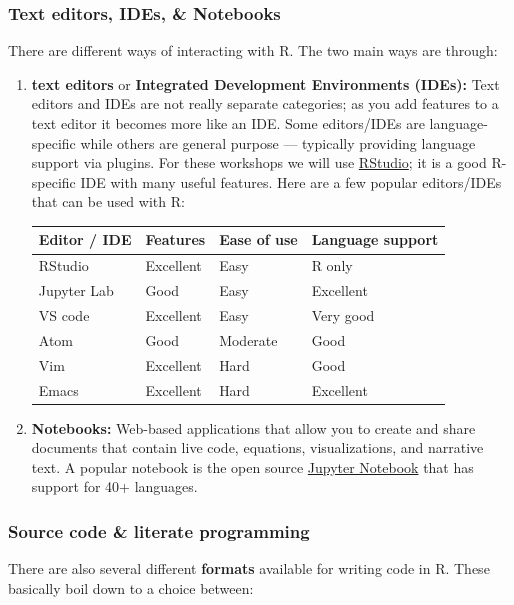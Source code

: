 \documentclass[
]{book}
\begin{document}
\hypertarget{text-editors-ides-notebooks}{%
\subsubsection{Text editors, IDEs, \& Notebooks}\label{text-editors-ides-notebooks}}

There are different ways of interacting with R. The two main ways are through:

\begin{enumerate}
\def\labelenumi{\arabic{enumi}.}
\item
  \textbf{text editors} or \textbf{Integrated Development Environments (IDEs):} Text editors and IDEs are not really separate categories; as you add features to a text editor it becomes more like an IDE. Some editors/IDEs are language-specific while others are general purpose --- typically providing language support via plugins. For these workshops we will use \href{https://rstudio.com/}{RStudio}; it is a good R-specific IDE with many useful features. Here are a few popular editors/IDEs that can be used with R:

  \begin{longtable}[]{@{}llll@{}}
  \toprule
  Editor / IDE & Features & Ease of use & Language support\tabularnewline
  \midrule
  \endhead
  RStudio & Excellent & Easy & R only\tabularnewline
  Jupyter Lab & Good & Easy & Excellent\tabularnewline
  VS code & Excellent & Easy & Very good\tabularnewline
  Atom & Good & Moderate & Good\tabularnewline
  Vim & Excellent & Hard & Good\tabularnewline
  Emacs & Excellent & Hard & Excellent\tabularnewline
  \bottomrule
  \end{longtable}
\item
  \textbf{Notebooks:} Web-based applications that allow you to create and share documents that contain live code, equations, visualizations, and narrative text. A popular notebook is the open source \href{https://jupyter.org/}{Jupyter Notebook} that has support for 40+ languages.
\end{enumerate}

\hypertarget{source-code-literate-programming}{%
\subsubsection{Source code \& literate programming}\label{source-code-literate-programming}}

There are also several different \textbf{formats} available for writing code in R.
These basically boil down to a choice between:
\end{document}
